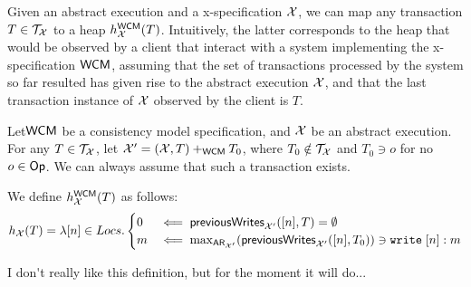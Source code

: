 \documentclass[a4paper,UKenglish]{article}%
\theoremstyle{plain}
\begin{document}
Given an abstract execution and a x-specification $\mathcal{X}$, we can map any transaction $T \in \mathcal{T}_{\mathcal{X}}$ 
to a heap $h_{\mathcal{X}}^{\mathsf{WCM}}(T)$. Intuitively, the latter corresponds to the heap that would be observed 
by a client that interact with a system implementing the x-specification $\mathsf{WCM}$, assuming that 
the set of transactions processed by the system so far resulted has given rise to the abstract execution 
$\mathcal{X}$, and that the last transaction instance of $\mathcal{X}$ observed by the client is $T$.

\begin{definition}
Let$\mathsf{WCM}$ be a consistency model specification, and $\mathcal{X}$ be an abstract execution. For any $T \in \mathcal{T}_{\mathcal{X}}$, 
let $\mathcal{X}' = (\mathcal{X}, T) +_{\mathsf{WCM}} T_0$, where $T_0 \notin \mathcal{T}_{\mathcal{X}}$ and $T_0 \ni o$ for no 
$o \in \mathsf{Op}$. We can always assume that such a transaction exists. 

We define $h_{\mathcal{X}}^{\mathsf{WCM}}(T)$ as follows:
\[
h_{\mathcal{X}}(T) = \lambda [n] \in Locs.
\begin{cases}
0 &\impliedby \mathsf{previousWrites}_{\mathcal{X}'}([n], T) = \emptyset\\
m & \impliedby \max_{{\sf{AR}}_{\mathcal{X}'}}(\mathsf{previousWrites}_{\mathcal{X}'}([n], T_0)) \ni {{\tt write}}\;[n]: m 
\end{cases}
\]
\end{definition}
\ac{I don't really like this definition, but for the moment it will do...}
\end{document}
